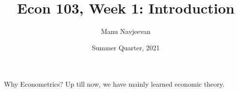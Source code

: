 \documentclass[notheorems]{beamer}
\title{Econ 103, Week 1: Introduction}
\author{Manu Navjeevan}
\date{Summer Quarter, 2021}
\institute{UCLA}
\begin{document}
\frame{\titlepage}

\begin{frame}{Why Econometrics?} 
	\label{frame:test}
	Up till now, we have mainly learned economic theory.	
\end{frame}
\end{document}
